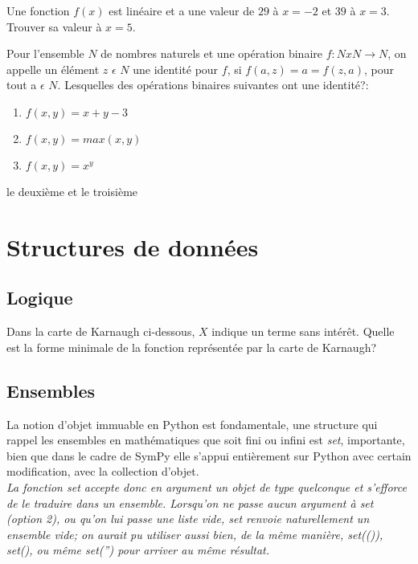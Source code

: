 \documentclass[11pt,fleqn]{book} %
\begin{document}
\begin{exercise}
Une fonction $f (x)$ est lin\'eaire et a une valeur de $29$ \`a $x = -2$ et $39$ à $x = 3$. Trouver sa valeur à $x = 5$.
\end{exercise}

\begin{exercise}
Pour l'ensemble $N$ de nombres naturels et une opération binaire $f: N x N \longrightarrow N$, on appelle un élément $z$ $\epsilon$ $N$ une identité pour $f$, si $f (a, z) = a = f (z, a)$, pour tout a $\epsilon$ $N$. Lesquelles des opérations binaires suivantes ont une identité?:
\begin{enumerate}
  \item $f (x, y) = x + y - 3$
  \item $f (x, y) = max(x, y)$
  \item $f (x, y) = x^{y}$
\end{enumerate}
\end{exercise}
\begin{solution}
le deuxième et le troisième 
\end{solution}
\section{Structures de données}

\subsection{Logique}
\begin{exercise}
Dans la carte de Karnaugh ci-dessous, $X$ indique un terme sans intérêt. Quelle est la forme minimale de la fonction représentée par la carte de Karnaugh?
\end{exercise}
\subsection{Ensembles}
La notion d'objet immuable en Python est fondamentale,  une structure qui rappel les ensembles en mathématiques que soit fini ou infini est \textit{set}, importante, bien que
dans le cadre de SymPy elle s'appui entièrement sur Python avec certain modification, avec la collection d'objet.
\\

\textit{La fonction set accepte donc en argument un objet de type quelconque et s'efforce de le traduire dans un ensemble. Lorsqu'on ne passe aucun argument à set (option 2), ou qu'on lui passe une liste vide, set renvoie naturellement un ensemble vide; on aurait pu utiliser aussi bien, de la même manière, set(()), set({}), ou même set('') pour arriver au même résultat.}
\end{document}
